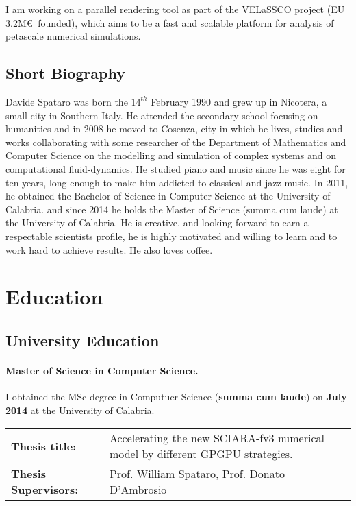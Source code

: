 \documentclass[a4paper,10pt]{article}
\begin{document}
I am working on a parallel rendering tool as part of the VELaSSCO project
(EU 3.2M\euro $\:$ founded), which aims to be a  fast and scalable platform for
analysis of petascale numerical simulations.

\subsection{Short Biography}
Davide Spataro was born the $14^{th}$ February 1990 and grew up in Nicotera, a
small city in Southern Italy.
He attended the secondary school focusing on humanities and in 2008 he moved to Cosenza, city in
which he lives, studies and works collaborating with some researcher of the Department of Mathematics
and Computer Science on the modelling and simulation of complex systems and on
computational fluid-dynamics. He studied piano and music since he was eight for ten years, long enough to make him
addicted to classical and jazz music. In 2011, he obtained the Bachelor of Science in Computer Science
at the University of Calabria. and since 2014 he holds the Master of Science (summa cum laude) at
the University of Calabria. He is creative, and looking forward to earn a respectable scientists profile,
he is highly motivated and willing to learn and to work hard to achieve results. He also loves coffee.


\begin{center}
\mbox{}
\end{center}


\section{Education}

\subsection{University Education}

\paragraph{Master of Science in Computer Science.} 

I obtained the MSc degree in Computuer Science (\textbf{summa cum laude}) on
\textbf{July 2014} at the University of Calabria.\\
{\centering
\begin{tabular}{l l}
\textbf{Thesis title:}& \textsf{Accelerating the new SCIARA-fv3 numerical model
by different GPGPU strategies.}\\
\textbf{Thesis Supervisors:} & Prof. William Spataro, Prof. Donato D'Ambrosio\\
\end{tabular}
}
\end{document}
